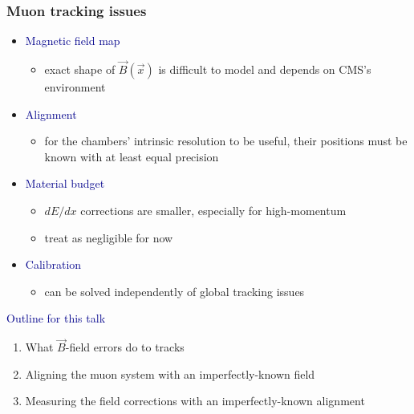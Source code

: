 \documentclass[compress]{beamer}
\begin{document}
\begin{frame}
\frametitle{Muon tracking issues}

\begin{itemize}
\item \textcolor{darkblue}{\large Magnetic field map}
\begin{itemize}
\item exact shape of $\vec{B}(\vec{x})$ is difficult to model and depends on CMS's environment
\end{itemize}

\item \textcolor{darkblue}{\large Alignment}
\begin{itemize}
\item for the chambers' intrinsic resolution to be useful, their positions
  must be known with at least equal precision
\end{itemize}

\item \textcolor{darkblue}{\large Material budget}
\begin{itemize}
\item $dE/dx$ corrections are smaller, especially for high-momentum
\item treat as negligible for now
\end{itemize}

\item \textcolor{darkblue}{\large Calibration}
\begin{itemize}
\item can be solved independently of global tracking issues
\end{itemize}
\end{itemize}

\vfill
\hspace{-0.83 cm} \textcolor{darkblue}{\Large Outline for this talk}
\begin{enumerate}
\item What $\vec{B}$-field errors do to tracks
\item Aligning the muon system with an imperfectly-known field
\item Measuring the field corrections with an imperfectly-known alignment
\end{enumerate}
\end{frame}
\end{document}
